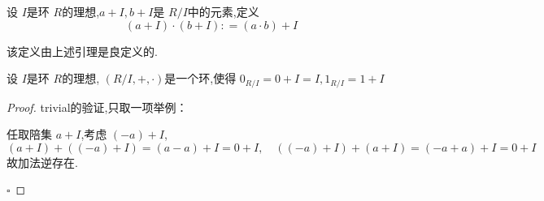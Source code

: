 \documentclass[lang=cn,12pt,color=green,fontset=none,pad]{elegantbook}
\begin{document}
\begin{definition}
    设 $ I $是环 $ R $的理想,$ a+ I, b+ I $是 $ R/I $中的元素,定义 $$
    \left( a+ I \right)\cdot \left( b+ I \right): = \left( a\cdot b \right)+ I   
    $$    
\end{definition}
\begin{remark}
    该定义由上述引理是良定义的.
\end{remark}

\begin{theorem}
    设 $ I $是环 $ R $的理想, $ \left( R/I,+ ,\cdot  \right)  $是一个环,使得 $ 0_{R/I} = 0+ I = I, 1_{R / I}= 1+ I $    
\end{theorem}
\begin{proof}
    trivial的验证,只取一项举例：

    任取陪集 $ a + I   $,考虑 $ \left( -a \right)+ I  $, $$
    \left( a+ I \right)+ \left( \left( -a \right)+ I  \right)= \left( a-a \right)+ I = 0+ I,\quad  \left( \left( -a \right)+ I  \right)+ \left( a+ I \right) = \left( -a+ a \right)+ I = 0+ I      
    $$  故加法逆存在.

    \hfill $\square$
\end{proof}
\end{document}
